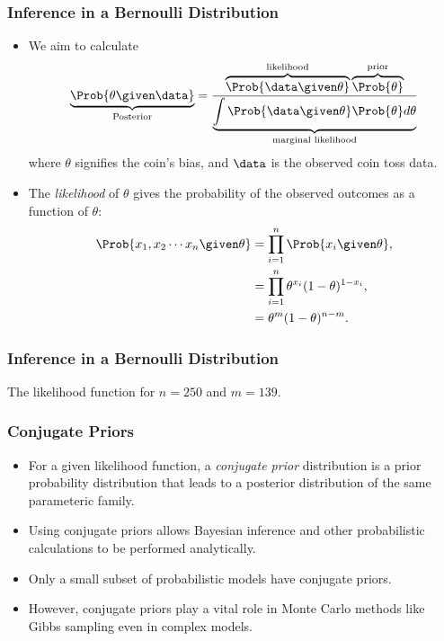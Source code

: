 \documentclass{slides}
\begin{document}
\begin{frame}
	\frametitle{Inference in a Bernoulli Distribution}
	\begin{itemize}
		\item We aim to calculate
		\[
			\underbrace{\Prob{\theta \given \data}}_{\text{Posterior}}
			= 
			\frac{\overbrace{\Prob{\data \given \theta}}^{\text{likelihood}}
				\overbrace{\Prob{\theta}}^{\text{prior}}}
				{\underbrace{\int \Prob{\data \given \theta}\Prob{\theta} d\theta}_{\text{marginal likelihood}}}
		\]
		where $\theta$ signifies the coin's bias, and $\data$ is the observed coin toss data.

	\item The \emph{likelihood} of $\theta$ gives the probability of the observed outcomes as a function of $\theta$:
			\begin{align*}
				\Prob{x_1, x_2\cdots x_n \given \theta} &= \prod_{i=1}^n \Prob{x_i \given \theta},\\
				& = \prod_{i=1}^n \theta^{x_i} (1-\theta)^{1-x_i},\\
				& = \theta^{m} (1-\theta)^{n-m}.
				\label{eq:bernoulli-likelihood}
			\end{align*}
	\end{itemize}
\end{frame}

\begin{frame}
	\frametitle{Inference in a Bernoulli Distribution}
	
		The likelihood function for $n=250$ and $m=139$.
\end{frame}

\begin{frame}
	\frametitle{Conjugate Priors}
	\begin{itemize}
		\item For a given likelihood function, a \emph{conjugate prior} distribution is a prior probability distribution that leads to a posterior distribution of the same parameteric family.
		\item Using conjugate priors allows Bayesian inference and other probabilistic calculations to be performed analytically.
		\item Only a small subset of probabilistic models have conjugate priors.
		\item However, conjugate priors play a vital role in Monte Carlo methods like Gibbs sampling even in complex models.
	\end{itemize}
\end{frame}
\end{document}
